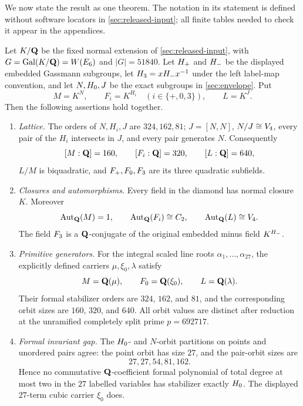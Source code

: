 

We now state the result as one theorem.  The notation in its statement is
defined without software locators in \cref{sec:released-input}; all finite
tables needed to check it appear in the appendices.

\begin{theorem}
\label{thm:integrated}
Let $K/\mathbf{Q}$ be the fixed normal extension of \cref{sec:released-input}, with
$G=\operatorname{Gal}(K/\mathbf{Q})=W(E_6)$ and $|G|=51840$.  Let $H_{+}$ and $H_{-}$ be the
displayed embedded Gassmann subgroups, let
$H_{3}=xH_{-} x^{-1}$ under the left label-map convention, and let
$N,H_{0},J$ be the exact subgroups in \cref{sec:envelope}.  Put
\[
 M=K^N,\qquad F_i=K^{H_i}\quad(i\in\{+,0,3\}),\qquad L=K^J.
\]
Then the following assertions hold together.
\begin{enumerate}[label=\textup{(\roman*)},leftmargin=2.8em]
\item \emph{Lattice.}  The orders of $N,H_i,J$ are $324,162,81$;
$J=[N,N]$, $N/J\cong V_4$, every pair of the $H_i$ intersects in $J$,
and every pair generates $N$.  Consequently
\[
 [M:\mathbf{Q}]=160,\qquad [F_i:\mathbf{Q}]=320,\qquad [L:\mathbf{Q}]=640,
\]
$L/M$ is biquadratic, and $F_{+},F_{0},F_{3}$ are its three quadratic
subfields.

\item \emph{Closures and automorphisms.}  Every field in the diamond has
normal closure $K$.  Moreover
\[
 \operatorname{Aut}_{\mathbf{Q}}(M)=1,\qquad \operatorname{Aut}_{\mathbf{Q}}(F_i)\cong C_2,
 \qquad \operatorname{Aut}_{\mathbf{Q}}(L)\cong V_4.
\]
The field $F_{3}$ is a $\mathbf{Q}$-conjugate of the original embedded minus
field $K^{H_{-}}$.

\item \emph{Primitive generators.}  For the integral scaled line roots
$\alpha_1,\ldots,\alpha_{27}$, the explicitly defined carriers
$\mu,\xi_0,\lambda$ satisfy
\[
 M=\mathbf{Q}(\mu),\qquad F_{0}=\mathbf{Q}(\xi_0),\qquad L=\mathbf{Q}(\lambda).
\]
Their formal stabilizer orders are $324$, $162$, and $81$, and the
corresponding orbit sizes are $160$, $320$, and $640$.  All orbit values are distinct after
reduction at the unramified completely split prime $p=692717$.

\item \emph{Formal invariant gap.}  The $H_{0}$- and $N$-orbit partitions
on points and unordered pairs agree: the point orbit has size $27$, and the
pair-orbit sizes are
\[
 27,27,54,81,162.
\]
Hence no commutative $\mathbf{Q}$-coefficient formal polynomial of total degree at
most two in the $27$ labelled variables has stabilizer exactly $H_{0}$.
The displayed $27$-term cubic carrier $\xi_0$ does.


\end{enumerate}
\end{theorem}
